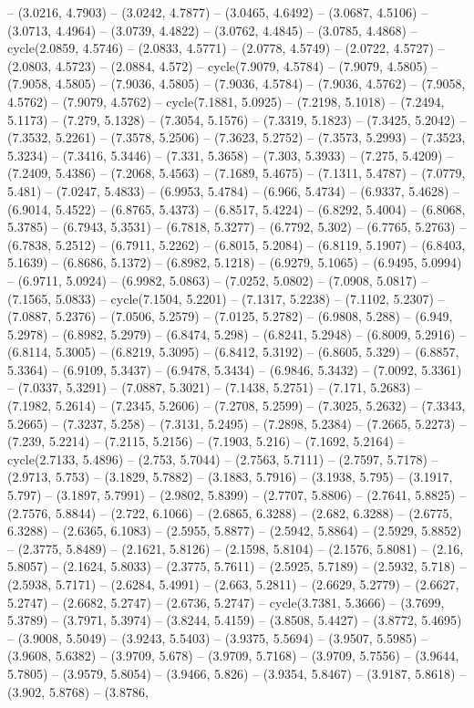 -- (3.0216, 4.7903) -- (3.0242, 4.7877) -- (3.0465, 4.6492) -- (3.0687, 4.5106) -- (3.0713, 4.4964) -- (3.0739, 4.4822) -- (3.0762, 4.4845) -- (3.0785, 4.4868) -- cycle(2.0859, 4.5746) -- (2.0833, 4.5771) -- (2.0778, 4.5749) -- (2.0722, 4.5727) -- (2.0803, 4.5723) -- (2.0884, 4.572) -- cycle(7.9079, 4.5784) -- (7.9079, 4.5805) -- (7.9058, 4.5805) -- (7.9036, 4.5805) -- (7.9036, 4.5784) -- (7.9036, 4.5762) -- (7.9058, 4.5762) -- (7.9079, 4.5762) -- cycle(7.1881, 5.0925) -- (7.2198, 5.1018) -- (7.2494, 5.1173) -- (7.279, 5.1328) -- (7.3054, 5.1576) -- (7.3319, 5.1823) -- (7.3425, 5.2042) -- (7.3532, 5.2261) -- (7.3578, 5.2506) -- (7.3623, 5.2752) -- (7.3573, 5.2993) -- (7.3523, 5.3234) -- (7.3416, 5.3446) -- (7.331, 5.3658) -- (7.303, 5.3933) -- (7.275, 5.4209) -- (7.2409, 5.4386) -- (7.2068, 5.4563) -- (7.1689, 5.4675) -- (7.1311, 5.4787) -- (7.0779, 5.481) -- (7.0247, 5.4833) -- (6.9953, 5.4784) -- (6.966, 5.4734) -- (6.9337, 5.4628) -- (6.9014, 5.4522) -- (6.8765, 5.4373) -- (6.8517, 5.4224) -- (6.8292, 5.4004) -- (6.8068, 5.3785) -- (6.7943, 5.3531) -- (6.7818, 5.3277) -- (6.7792, 5.302) -- (6.7765, 5.2763) -- (6.7838, 5.2512) -- (6.7911, 5.2262) -- (6.8015, 5.2084) -- (6.8119, 5.1907) -- (6.8403, 5.1639) -- (6.8686, 5.1372) -- (6.8982, 5.1218) -- (6.9279, 5.1065) -- (6.9495, 5.0994) -- (6.9711, 5.0924) -- (6.9982, 5.0863) -- (7.0252, 5.0802) -- (7.0908, 5.0817) -- (7.1565, 5.0833) -- cycle(7.1504, 5.2201) -- (7.1317, 5.2238) -- (7.1102, 5.2307) -- (7.0887, 5.2376) -- (7.0506, 5.2579) -- (7.0125, 5.2782) -- (6.9808, 5.288) -- (6.949, 5.2978) -- (6.8982, 5.2979) -- (6.8474, 5.298) -- (6.8241, 5.2948) -- (6.8009, 5.2916) -- (6.8114, 5.3005) -- (6.8219, 5.3095) -- (6.8412, 5.3192) -- (6.8605, 5.329) -- (6.8857, 5.3364) -- (6.9109, 5.3437) -- (6.9478, 5.3434) -- (6.9846, 5.3432) -- (7.0092, 5.3361) -- (7.0337, 5.3291) -- (7.0887, 5.3021) -- (7.1438, 5.2751) -- (7.171, 5.2683) -- (7.1982, 5.2614) -- (7.2345, 5.2606) -- (7.2708, 5.2599) -- (7.3025, 5.2632) -- (7.3343, 5.2665) -- (7.3237, 5.258) -- (7.3131, 5.2495) -- (7.2898, 5.2384) -- (7.2665, 5.2273) -- (7.239, 5.2214) -- (7.2115, 5.2156) -- (7.1903, 5.216) -- (7.1692, 5.2164) -- cycle(2.7133, 5.4896) -- (2.753, 5.7044) -- (2.7563, 5.7111) -- (2.7597, 5.7178) -- (2.9713, 5.753) -- (3.1829, 5.7882) -- (3.1883, 5.7916) -- (3.1938, 5.795) -- (3.1917, 5.797) -- (3.1897, 5.7991) -- (2.9802, 5.8399) -- (2.7707, 5.8806) -- (2.7641, 5.8825) -- (2.7576, 5.8844) -- (2.722, 6.1066) -- (2.6865, 6.3288) -- (2.682, 6.3288) -- (2.6775, 6.3288) -- (2.6365, 6.1083) -- (2.5955, 5.8877) -- (2.5942, 5.8864) -- (2.5929, 5.8852) -- (2.3775, 5.8489) -- (2.1621, 5.8126) -- (2.1598, 5.8104) -- (2.1576, 5.8081) -- (2.16, 5.8057) -- (2.1624, 5.8033) -- (2.3775, 5.7611) -- (2.5925, 5.7189) -- (2.5932, 5.718) -- (2.5938, 5.7171) -- (2.6284, 5.4991) -- (2.663, 5.2811) -- (2.6629, 5.2779) -- (2.6627, 5.2747) -- (2.6682, 5.2747) -- (2.6736, 5.2747) -- cycle(3.7381, 5.3666) -- (3.7699, 5.3789) -- (3.7971, 5.3974) -- (3.8244, 5.4159) -- (3.8508, 5.4427) -- (3.8772, 5.4695) -- (3.9008, 5.5049) -- (3.9243, 5.5403) -- (3.9375, 5.5694) -- (3.9507, 5.5985) -- (3.9608, 5.6382) -- (3.9709, 5.678) -- (3.9709, 5.7168) -- (3.9709, 5.7556) -- (3.9644, 5.7805) -- (3.9579, 5.8054) -- (3.9466, 5.826) -- (3.9354, 5.8467) -- (3.9187, 5.8618) -- (3.902, 5.8768) -- (3.8786, 